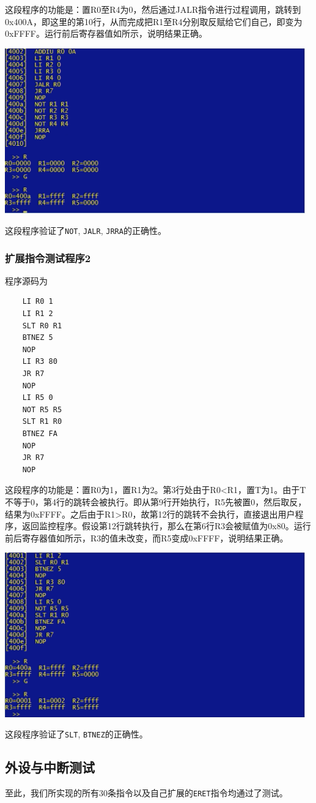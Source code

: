 这段程序的功能是：置R0至R4为0，然后通过JALR指令进行过程调用，跳转到0x400A，即这里的第10行，从而完成把R1至R4分别取反赋给它们自己，即变为0xFFFF。运行前后寄存器值如所示，说明结果正确。

\begin{center}
    \includegraphics[width=13cm]{image/testing/p1}
    \label{fig:testp1}
\end{center}

这段程序验证了\texttt{NOT}, \texttt{JALR}, \texttt{JRRA}的正确性。

\subsubsection{扩展指令测试程序2}

程序源码为

\begin{lstlisting}
    LI R0 1
    LI R1 2
    SLT R0 R1
    BTNEZ 5
    NOP
    LI R3 80
    JR R7
    NOP
    LI R5 0
    NOT R5 R5
    SLT R1 R0
    BTNEZ FA
    NOP
    JR R7
    NOP
\end{lstlisting}

这段程序的功能是：置R0为1，置R1为2。第3行处由于R0<R1，置T为1。由于T不等于0，第4行的跳转会被执行。即从第9行开始执行，R5先被置0，然后取反，结果为0xFFFF。之后由于R1>R0，故第12行的跳转不会执行，直接退出用户程序，返回监控程序。假设第12行跳转执行，那么在第6行R3会被赋值为0x80。运行前后寄存器值如所示，R3的值未改变，而R5变成0xFFFF，说明结果正确。

\begin{center}
    \includegraphics[width=13cm]{image/testing/p2}
    \label{fig:testp2}
\end{center}

这段程序验证了\texttt{SLT}, \texttt{BTNEZ}的正确性。

\subsection{外设与中断测试}



至此，我们所实现的所有30条指令以及自己扩展的\texttt{ERET}指令均通过了测试。
